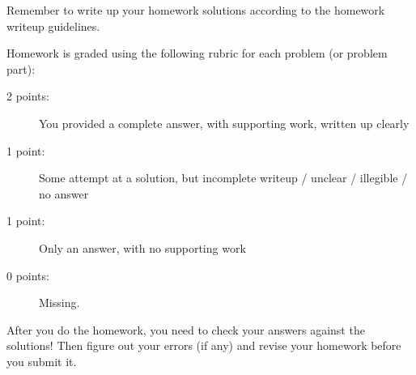 \documentclass[11pt, oneside]{article}   	%
\begin{document}
\hrulefill

Remember to write up your homework solutions according to the homework writeup guidelines. 

Homework is graded using the following rubric for each problem (or problem part):

\begin{description}
\item[2 points:] You provided a complete answer, with supporting work, written up clearly
\item[1 point:] Some attempt at a solution, but incomplete writeup / unclear / illegible / no answer
\item[1 point:] Only an answer, with no supporting work 
\item[0 points:] Missing.
\end{description}

After you do the homework, you need to check your answers against the solutions! Then figure out your errors (if any) and revise your homework before you submit it. 
\end{document}
